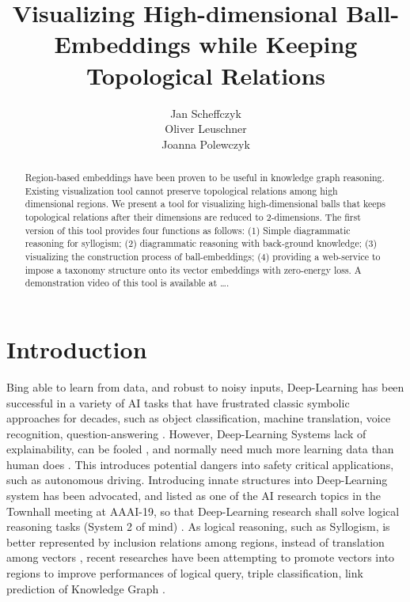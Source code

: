 \documentclass[]{article}
\title{Visualizing High-dimensional Ball-Embeddings
	while Keeping Topological Relations}
\author{Jan Scheffczyk \\ Oliver Leuschner \\ Joanna Polewczyk}
\begin{document}
\maketitle

\begin{abstract}
	Region-based embeddings have been proven to be useful in knowledge graph reasoning. Existing visualization tool cannot preserve topological relations among high dimensional regions. We present a tool for visualizing high-dimensional balls that keeps topological relations after their dimensions are reduced to 2-dimensions. The first version of this tool provides four functions as follows: (1) Simple diagrammatic reasoning for syllogism; (2) diagrammatic reasoning with back-ground knowledge; (3) visualizing the construction process of ball-embeddings; (4) providing a web-service to impose a taxonomy structure onto its vector embeddings with zero-energy loss. A demonstration video of this tool is available at \dots. 
	
\end{abstract}
%
%
%
\newpage
\section{Introduction}

Bing able to learn from data, and robust to noisy inputs, Deep-Learning has been successful in a variety of AI tasks that have frustrated classic symbolic approaches for decades, such as object classification, machine translation, voice recognition, question-answering \cite{LeCunNature15}. However, Deep-Learning  Systems lack of explainability, can be fooled \cite{BiDAF16,JiaLiangaL17,Belinkov17}, and normally need much more learning data than human does \cite{tenenbaum15}. This introduces potential dangers into safety critical applications, such as autonomous driving. Introducing innate structures into Deep-Learning system has been advocated, and listed as one of the AI research topics in the Townhall meeting at AAAI-19, so that Deep-Learning research shall solve logical reasoning tasks (System 2 of mind) \cite{Kahneman11,benjio19}. As logical reasoning, such as Syllogism, is better represented by inclusion relations among regions, instead of translation among vectors \cite{Venn1880,diagram95}, recent researches have been attempting to promote vectors into regions to improve performances of logical query, triple classification, link prediction of Knowledge Graph \cite{dong19iclr,dong19,li2019smoothing,JuanziEmnlp18,ren2020}.   
\end{document}
